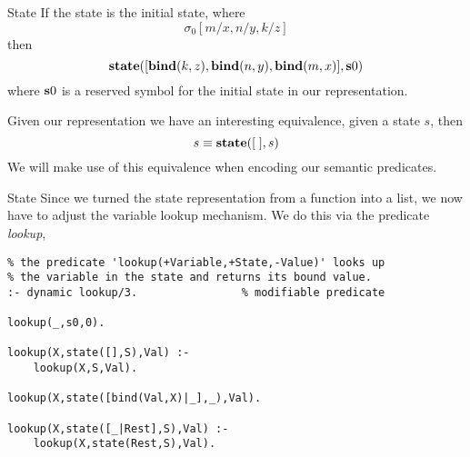 \documentclass{beamer}
\begin{document}
\begin{frame}{State}
\small
If the state is the initial state, where
\[
\sigma_0[m/x,n/y,k/z]
\]
then
\[
{\bf state}([{\bf bind}(k,z),{\bf bind}(n,y),{\bf bind}(m,x)],{\bf s}0)
\]
where ${\bf s}0$ is a reserved symbol for the initial state in our representation.

\vspace{.1in}

Given our representation we have an interesting equivalence, given a state $s$, then
\[
s \equiv {\bf state}([\; ],s)
\]
We will make use of this equivalence when encoding our semantic predicates.
\end{frame}

\begin{frame}[fragile]{State}
\small
Since we turned the state representation from a function into a list, we now have to adjust
the variable lookup mechanism.  We do this via the predicate {\em lookup},

{\scriptsize
\begin{verbatim}
% the predicate 'lookup(+Variable,+State,-Value)' looks up
% the variable in the state and returns its bound value.
:- dynamic lookup/3.                % modifiable predicate

lookup(_,s0,0).

lookup(X,state([],S),Val) :-
    lookup(X,S,Val).

lookup(X,state([bind(Val,X)|_],_),Val).

lookup(X,state([_|Rest],S),Val) :-
    lookup(X,state(Rest,S),Val).
\end{verbatim}
}

\end{frame}
\end{document}
